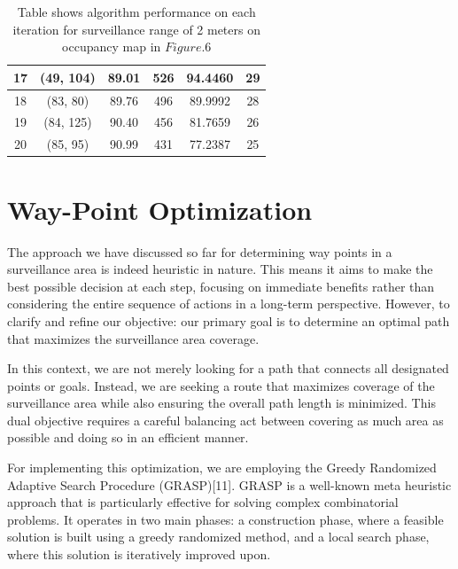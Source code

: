 \begin{table}[ht]
\begin{tabular}{|c|c|c|c|c|c|}
17        & (49, 104) & 89.01           & 526       & 94.4460                & 29                     \\ \hline
18        & (83, 80)  & 89.76           & 496       & 89.9992                & 28                     \\ \hline
19        & (84, 125) & 90.40           & 456       & 81.7659                & 26                     \\ \hline
20        & (85, 95)  & 90.99           & 431       & 77.2387                & 25                     \\ \hline
\end{tabular}
\caption{Table shows algorithm performance on each iteration for surveillance range of 2 meters on occupancy map in \(Figure.6\)}
\label{table:Table shows coverage area for each iterations, 
 selected frontiers, Exection time on cpu & multi processing}
\end{table} 



\section{Way-Point Optimization}

The approach we have discussed so far for determining way points in a surveillance area is indeed heuristic in nature. This means it aims to make the best possible decision at each step, focusing on immediate benefits rather than considering the entire sequence of actions in a long-term perspective. However, to clarify and refine our objective: our primary goal is to determine an optimal path that maximizes the surveillance area coverage.

In this context, we are not merely looking for a path that connects all designated points or goals. Instead, we are seeking a route that maximizes coverage of the surveillance area while also ensuring the overall path length is minimized. This dual objective requires a careful balancing act between covering as much area as possible and doing so in an efficient manner.

For implementing this optimization, we are employing the Greedy Randomized Adaptive Search Procedure (GRASP)[11]. GRASP is a well-known meta heuristic approach that is particularly effective for solving complex combinatorial problems. It operates in two main phases: a construction phase, where a feasible solution is built using a greedy randomized method, and a local search phase, where this solution is iteratively improved upon.

